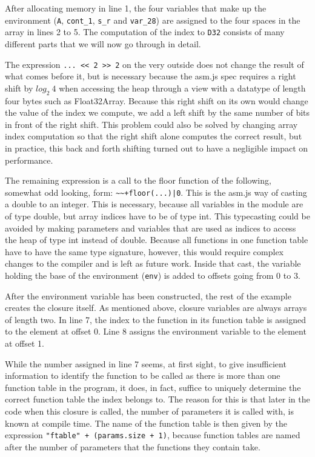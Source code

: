 \documentclass[11pt]{report}
\begin{document}
After allocating memory in line 1, the four variables that make up the environment (\texttt{A}, \texttt{cont_1}, \texttt{s_r} and \texttt{var_28}) are assigned to the four spaces in the array in lines 2 to 5. The computation of the index to \texttt{D32} consists of many different parts that we will now go through in detail.

The expression \texttt{... {<}< 2 {>}> 2} on the very outside does not change the result of what comes before it, but is necessary because the asm.js spec requires a right shift by $log_2~4$ when accessing the heap through a view with a datatype of length four bytes such as Float32Array. Because this right shift on its own would change the value of the index we compute, we add a left shift by the same number of bits in front of the right shift. This problem could also be solved by changing array index computation so that the right shift alone computes the correct result, but in practice, this back and forth shifting turned out to have a negligible impact on performance.

The remaining expression is a call to the floor function of the following, somewhat odd looking, form: \texttt{\textasciitilde\textasciitilde+floor(...)|0}. This is the asm.js way of casting a double to an integer. This is necessary, because all variables in the module are of type double, but array indices have to be of type int. This typecasting could be avoided by making parameters and variables that are used as indices to access the heap of type int instead of double. Because all functions in one function table have to have the same type signature, however, this would require complex changes to the compiler and is left as future work. Inside that cast, the variable holding the base of the environment (\texttt{env}) is added to offsets going from $0$ to $3$. 

After the environment variable has been constructed, the rest of the example creates the closure itself. As mentioned above, closure variables are always arrays of length two. In line 7, the index to the function in its function table is assigned to the element at offset 0. Line 8 assigns the environment variable to the element at offset 1.

While the number assigned in line 7 seems, at first sight, to give insufficient information to identify the function to be called as there is more than one function table in the program, it does, in fact, suffice to uniquely determine the correct function table the index belongs to. The reason for this is that later in the code when this closure is called, the number of parameters it is called with, is known at compile time. The name of the function table is then given by the expression \texttt{"ftable" + (params.size + 1)}, because function tables are named after the number of parameters that the functions they contain take.
\end{document}
